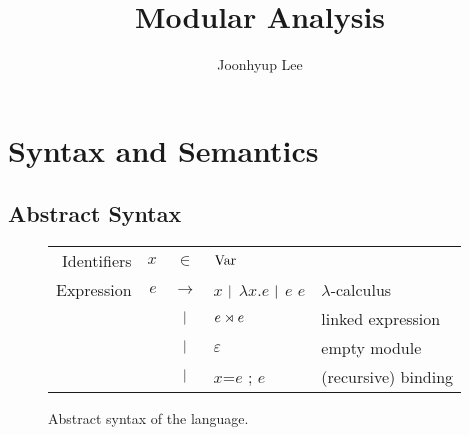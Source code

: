\documentclass{article}
\title{Modular Analysis}
\author{Joonhyup Lee}
\begin{document}
\maketitle
\section{Syntax and Semantics}
\subsection{Abstract Syntax}
\begin{figure}[htb]
  \centering
  \begin{tabular}{rrcll}
    Identifiers & $x$ & $\in$         & $\text{Var}$                                                      \\
    Expression  & $e$ & $\rightarrow$ & $x$ $|$ $\lambda x.e$ $|$ $e$ $e$ & $\lambda$-calculus  \\
                &     & $|$       & ${e}\rtimes{e}$                             & linked expression   \\
                &     & $|$       & $\varepsilon$                             & empty module        \\
                &     & $|$       & $x\texttt{=}e$ ; $e$                      & (recursive) binding
  \end{tabular}
  \caption{Abstract syntax of the language.}
  \label{fig:syntax}
\end{figure}
\end{document}
